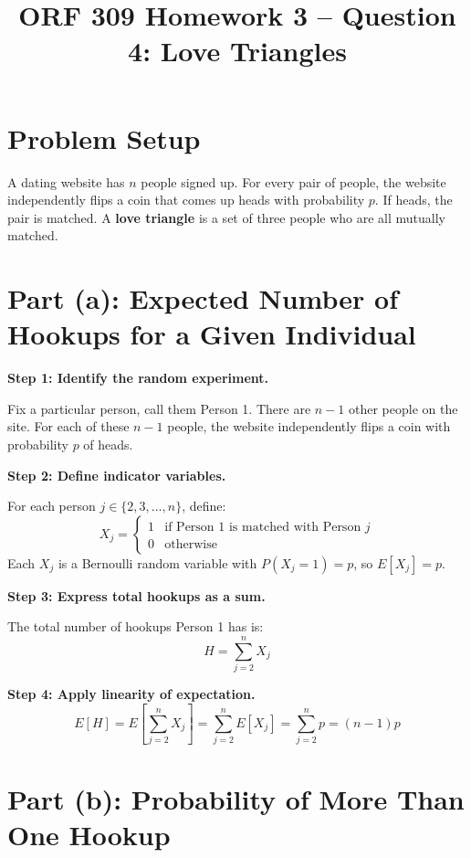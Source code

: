 \documentclass[11pt]{article}
\title{ORF 309 Homework 3 -- Question 4: Love Triangles}
\author{}
\date{}
\begin{document}
\maketitle

\section*{Problem Setup}

A dating website has $n$ people signed up. For every pair of people, the website independently flips a coin that comes up heads with probability $p$. If heads, the pair is matched. A \textbf{love triangle} is a set of three people who are all mutually matched.

\section*{Part (a): Expected Number of Hookups for a Given Individual}

\textbf{Step 1: Identify the random experiment.}

Fix a particular person, call them Person 1. There are $n - 1$ other people on the site. For each of these $n-1$ people, the website independently flips a coin with probability $p$ of heads.

\textbf{Step 2: Define indicator variables.}

For each person $j \in \{2, 3, \ldots, n\}$, define:
\[
X_j = \begin{cases} 1 & \text{if Person 1 is matched with Person } j \\ 0 & \text{otherwise} \end{cases}
\]
Each $X_j$ is a Bernoulli random variable with $P(X_j = 1) = p$, so $E[X_j] = p$.

\textbf{Step 3: Express total hookups as a sum.}

The total number of hookups Person 1 has is:
\[
H = \sum_{j=2}^{n} X_j
\]

\textbf{Step 4: Apply linearity of expectation.}
\[
E[H] = E\left[\sum_{j=2}^{n} X_j\right] = \sum_{j=2}^{n} E[X_j] = \sum_{j=2}^{n} p = (n-1)p
\]

\begin{center}
\end{center}

\section*{Part (b): Probability of More Than One Hookup}
\end{document}
